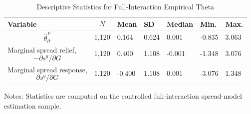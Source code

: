 \begin{table}[H]\centering
\begin{threeparttable}
\caption{Descriptive Statistics for Full-Interaction Empirical Theta}
\label{tab:theta_descriptive_stats}
\scriptsize
\begin{tabularx}{\textwidth}{lYYYYYY}
\toprule
Variable & $$N$$ & Mean & SD & Median & Min. & Max. \\
\midrule
$$\widehat{\theta}^{F}_{it}$$ & 1,120 & 0.164 & 0.624 & 0.001 & -0.835 & 3.063 \\
Marginal spread relief, $$-\partial s^g/\partial G$$ & 1,120 & 0.400 & 1.108 & -0.001 & -1.348 & 3.076 \\
Marginal spread response, $$\partial s^g/\partial G$$ & 1,120 & -0.400 & 1.108 & 0.001 & -3.076 & 1.348 \\
\bottomrule
\end{tabularx}
\begin{tablenotes}[flushleft]\footnotesize
\item Notes: Statistics are computed on the controlled full-interaction spread-model estimation sample.
\end{tablenotes}
\end{threeparttable}
\end{table}
